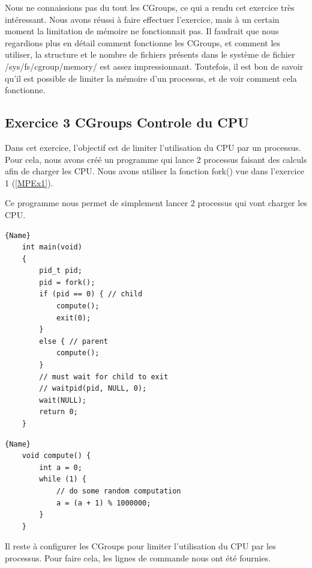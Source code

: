 \documentclass[
	a4paper, %
	10pt, %
]{CSUniSchoolLabReport}
\begin{document}

Nous ne connaissions pas du tout les CGroups, ce qui a rendu cet exercice tr\`es int\'eressant.
Nous avons réussi \`a faire effectuer l'exercice, mais \`a un certain moment la limitation de m\'emoire ne fonctionnait pas.
Il faudrait que nous regardions plus en d\'etail comment fonctionne les CGroups, et comment les utiliser, la structure et le nombre de fichiers pr\'esents dans le syst\`eme de fichier /sys/fs/cgroup/memory/ est assez impressionnant.
Toutefois, il est bon de savoir qu'il est possible de limiter la m\'emoire d'un processus, et de voir comment cela fonctionne.

\subsection{Exercice 3 CGroups Controle du CPU}\label{MPEx3}
Dans cet exercice, l'objectif est de limiter l'utilisation du CPU par un processus.
Pour cela, nous avons cré\'e un programme qui lance 2 processus faisant des calculs afin de charger les CPU. 
Nous avons utiliser la fonction fork() vue dans l'exercice 1 (\ref{MPEx1}).

Ce programme nous permet de simplement lancer 2 processus qui vont charger les CPU.\\
\noindent\begin{minipage}{.50\textwidth}
	\begin{lstlisting}[style=CStyle, caption=Processus Enfant, firstnumber=1]{Name}
	int main(void)
	{
		pid_t pid;
		pid = fork();
		if (pid == 0) { // child
			compute();
			exit(0);
		}
		else { // parent
			compute();
		}
		// must wait for child to exit
		// waitpid(pid, NULL, 0);
		wait(NULL);
		return 0;
	}
	\end{lstlisting}
	\end{minipage}\hfill
	\begin{minipage}{.45\textwidth}
	\begin{lstlisting}[style=CStyle, caption=Processus Parent, firstnumber=1]{Name}
	void compute() {
		int a = 0;
		while (1) {
			// do some random computation
			a = (a + 1) % 1000000;
		}
	}
	\end{lstlisting}
\end{minipage}

Il reste \`a configurer les CGroups pour limiter l'utilisation du CPU par les processus. Pour faire cela, les lignes de commande nous ont été fournies.
\end{document}
